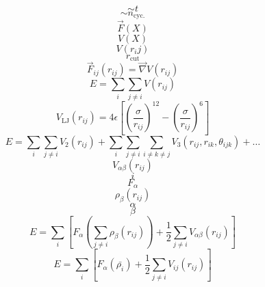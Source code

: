 \documentclass{scrreprt}
\begin{document}
\begin{equation}
\sim t
\end{equation}
\begin{equation}
\sim n_\text{cyc.}
\end{equation}
\begin{equation}
\vec F(X)
\end{equation}
\begin{equation}
V(X)
\end{equation}
\begin{equation}
V(r_ij)
\end{equation}
\begin{equation}
r_\text{cut}
\end{equation}
\begin{equation}
  \vec F_{ij}(r_{ij}) = \vec\nabla V(r_{ij})
\end{equation}
\begin{equation}
  E = \sum_i\sum_{j \neq i}{V(r_{ij})}
\end{equation}
\begin{equation}
  V_\text{LJ}(r_{ij}) = 4 \epsilon \left[\left(\frac{\sigma}{r_{ij}}\right)^{12} - \left(\frac{\sigma}{r_{ij}}\right)^{6}\right]
\end{equation}
\begin{equation}
  E = \sum_i\sum_{j \neq i}{V_2\left(r_{ij}\right)} + \sum_i\sum_{j \neq i}\sum_{i \neq k \neq j}{V_3\left(r_{ij}, r_{ik}, \theta_{ijk}\right)} + \dots
\end{equation}
\begin{equation}
V_{\alpha\beta}(r_{ij})
\end{equation}
\begin{equation}
i
\end{equation}
\begin{equation}
F_\alpha
\end{equation}
\begin{equation}
\rho_\beta(r_{ij})
\end{equation}
\begin{equation}
\alpha
\end{equation}
\begin{equation}
\beta
\end{equation}
\begin{equation}
  E = \sum_i\left[F_\alpha\left(\sum_{j\neq i}{\rho_\beta\left(r_{ij}\right)}\right) + \frac{1}{2}\sum_{j\neq i}{V_{\alpha\beta}\left(r_{ij}\right)}\right]
\end{equation}
\begin{equation}
  E = \sum_i\left[F_\alpha\left(\bar{\rho_i}\right) + \frac{1}{2}\sum_{j\neq i}{V_{ij}\left(r_{ij}\right)}\right]
\end{equation}
\end{document}
